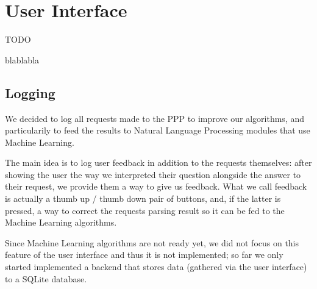 \chapter{User Interface}

TODO

blablabla

\section{Logging}

We decided to log all requests made to the PPP to improve our algorithms,
and particularily to feed the results to Natural Language Processing
modules that use Machine Learning.

The main idea is to log user feedback in addition to the requests
themselves: after showing the user the way we interpreted their
question alongside the answer to their request, we provide them a
way to give us feedback.
What we call feedback is actually a thumb up / thumb down pair of
buttons, and, if the latter is pressed, a way to correct the requests
parsing result so it can be fed to the Machine Learning algorithms.

Since Machine Learning algorithms are not ready yet, we did not focus
on this feature of the user interface and thus it is not implemented;
so far we only started implemented a backend that stores data
(gathered via the user interface) to a SQLite database.
